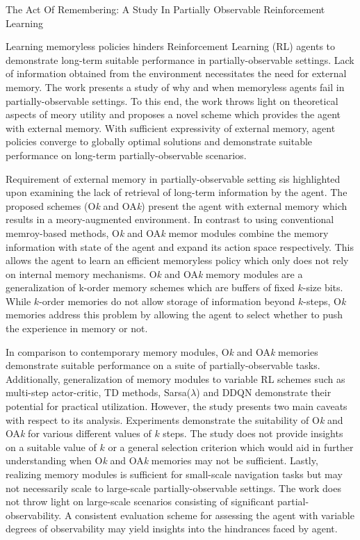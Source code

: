 \documentclass[12pt,letterpaper]{article}
\begin{document}
\begin{center}
  \large{The Act Of Remembering: A Study In Partially Observable Reinforcement Learning}
\end{center}

Learning memoryless policies hinders Reinforcement Learning (RL) agents to demonstrate long-term suitable performance in partially-observable settings. Lack of information obtained from the environment necessitates the need for external memory. The work presents a study of why and when memoryless agents fail in partially-observable settings. To this end, the work throws light on theoretical aspects of meory utility and proposes a novel scheme which provides the agent with external memory. With sufficient expressivity of external memory, agent policies converge to globally optimal solutions and demonstrate suitable performance on long-term partially-observable scenarios. 

Requirement of external memory in partially-observable setting sis highlighted upon examining the lack of retrieval of long-term information by the agent. The proposed schemes (O\textit{k} and OA\textit{k}) present the agent with external memory which results in a meory-augmented environment. In contrast to using conventional memroy-based methods, O\textit{k} and OA\textit{k} memor modules combine the memory information with state of the agent and expand its action space respectively. This allows the agent to learn an efficient memoryless policy which only does not rely on internal memory mechanisms. O\textit{k} and OA\textit{k} memory modules are a generalization of k-order memory schemes which are buffers of fixed $k$-size bits. While $k$-order memories do not allow storage of information beyond $k$-steps, O\textit{k} memories address this problem by allowing the agent to select whether to push the experience in memory or not.

In comparison to contemporary memory modules, O\textit{k} and OA\textit{k} memories demonstrate suitable performance on a suite of partially-observable tasks. Additionally, generalization of memory modules to variable RL schemes such as multi-step actor-critic, TD methods, Sarsa($\lambda$) and DDQN demonstrate their potential for practical utilization. However, the study presents two main caveats with respect to its analysis. Experiments demonstrate the suitability of O\textit{k} and OA\textit{k} for various different values of $k$ steps. The study does not provide insights on a suitable value of $k$ or a general selection criterion which would aid in further understanding when O\textit{k} and OA\textit{k} memories may not be sufficient. Lastly, realizing memory modules is sufficient for small-scale navigation tasks but may not necessarily scale to large-scale partially-observable settings. The work does not throw light on large-scale scenarios consisting of significant partial-observability. A consistent evaluation scheme for assessing the agent with variable degrees of observability may yield insights into the hindrances faced by agent. 
\end{document}
